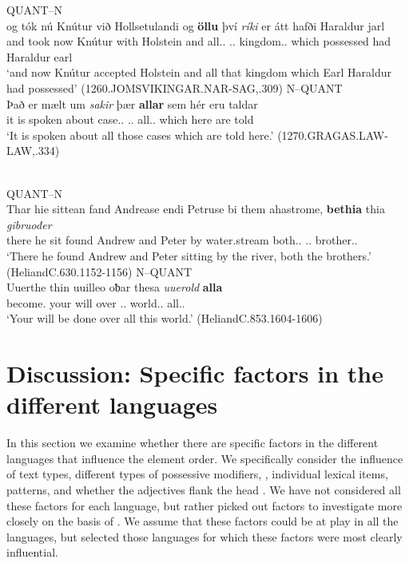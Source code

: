 \documentclass[output=paper,colorlinks,citecolor=brown,draft]{langscibook}
\begin{document}
\ea\label{OOIQN}
\ea QUANT--N\\
\gll og tók nú Knútur við Hollsetulandi og \textbf{öllu} því \textit{ríki} er átt hafði Haraldur jarl\\
and took now Knútur with Holstein and all.\DAT.\SG{} \DEM.\DAT.\SG{}
kingdom.\DAT.\SG{} which possessed had Haraldur earl\\
\glt ‘and now Knútur accepted Holstein and all that kingdom which Earl Haraldur had possessed’ (1260.JOMSVIKINGAR.NAR-SAG,.309)
\ex\label{OINQ}
N--QUANT\\
\gll Það er mælt um \textit{sakir} þær \textbf{allar} sem hér eru taldar\\
	it is spoken about case.\ACC.\PL{} \DEM.\ACC.\PL{} all.\ACC.\PL{} which here are told\\
\glt ‘It is spoken about all those cases which are told here.’
(1270.GRAGAS.LAW-LAW,.334)
\z
\z

\ea\label{OSQN}
\\
\ea QUANT--N\\
\gll Thar hie sittean fand Andrease endi Petruse bi them ahastrome, \textbf{bethia} thia \textit{gibruođer}\\
there he sit found Andrew and Peter by \DEF{} water.stream both.\ACC.\PL{} \DEF.\ACC.\PL{} brother.\ACC.\PL{}\\
\glt ‘There he found Andrew and Peter sitting by the river, both the brothers.’ (HeliandC.630.1152-1156)
\pagebreak\ex\label{OSNQ}
N--QUANT\\
\gll Uuerthe thin uuilleo oƀar thesa \textit{uuerold} \textbf{alla}\\
	become.\SBJV{} your will over \DEM.\ACC.\SG{} world.\ACC.\SG{} all.\ACC.\SG{}\\
\glt ‘Your will be done over all this world.’ (HeliandC.853.1604-1606)
\z
\z


\section{Discussion: Specific factors in the different languages}\label{sectdisc}\largerpage

In this section we examine whether there are specific factors in the different languages that influence the element order. We specifically consider the influence of text types, different types of possessive modifiers, , individual lexical items,  patterns, and whether the adjectives flank the head . We have not considered all these factors for each language, but rather picked out factors to investigate more closely on the basis of . We assume that these factors could be at play in all the languages, but selected those languages for which these factors were most clearly influential. 
\end{document}
